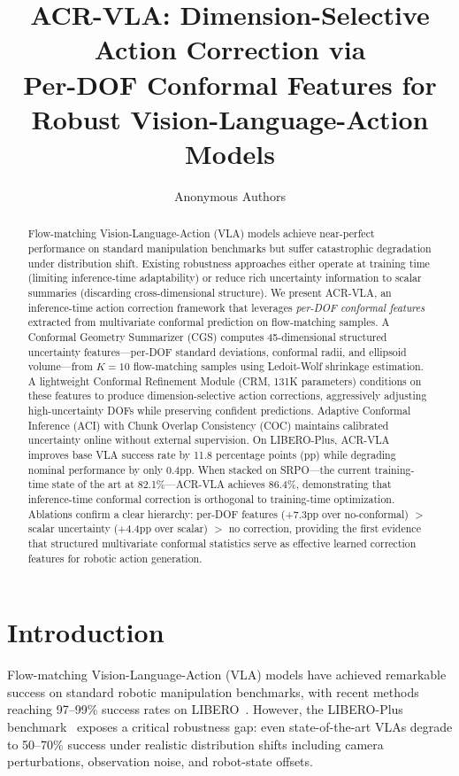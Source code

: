 \documentclass[10pt,letterpaper]{article}
\title{ACR-VLA: Dimension-Selective Action Correction via\\Per-DOF Conformal Features for Robust Vision-Language-Action Models}
\author{
  Anonymous Authors
}
\newcommand{\ours}{ACR-VLA}
\newcommand{\crm}{CRM}
\newcommand{\cgs}{CGS}
\newcommand{\aci}{ACI}
\newcommand{\coc}{COC}
\begin{document}
\maketitle

\begin{abstract}
Flow-matching Vision-Language-Action (VLA) models achieve near-perfect performance on standard manipulation benchmarks but suffer catastrophic degradation under distribution shift.
Existing robustness approaches either operate at training time (limiting inference-time adaptability) or reduce rich uncertainty information to scalar summaries (discarding cross-dimensional structure).
We present \ours{}, an inference-time action correction framework that leverages \emph{per-DOF conformal features} extracted from multivariate conformal prediction on flow-matching samples.
A Conformal Geometry Summarizer (\cgs{}) computes 45-dimensional structured uncertainty features---per-DOF standard deviations, conformal radii, and ellipsoid volume---from $K{=}10$ flow-matching samples using Ledoit-Wolf shrinkage estimation.
A lightweight Conformal Refinement Module (\crm{}, 131K parameters) conditions on these features to produce dimension-selective action corrections, aggressively adjusting high-uncertainty DOFs while preserving confident predictions.
Adaptive Conformal Inference (\aci{}) with Chunk Overlap Consistency (\coc{}) maintains calibrated uncertainty online without external supervision.
On LIBERO-Plus, \ours{} improves base VLA success rate by 11.8 percentage points (pp) while degrading nominal performance by only 0.4pp.
When stacked on SRPO---the current training-time state of the art at 82.1\%---\ours{} achieves 86.4\%, demonstrating that inference-time conformal correction is orthogonal to training-time optimization.
Ablations confirm a clear hierarchy: per-DOF features (+7.3pp over no-conformal) $>$ scalar uncertainty (+4.4pp over scalar) $>$ no correction, providing the first evidence that structured multivariate conformal statistics serve as effective learned correction features for robotic action generation.
\end{abstract}

\section{Introduction}
\label{sec:intro}

Flow-matching Vision-Language-Action (VLA) models have achieved remarkable success on standard robotic manipulation benchmarks, with recent methods reaching 97--99\% success rates on LIBERO~\cite{liu2024libero}.
However, the LIBERO-Plus benchmark~\cite{liangplus2025} exposes a critical robustness gap: even state-of-the-art VLAs degrade to 50--70\% success under realistic distribution shifts including camera perturbations, observation noise, and robot-state offsets.
\end{document}
